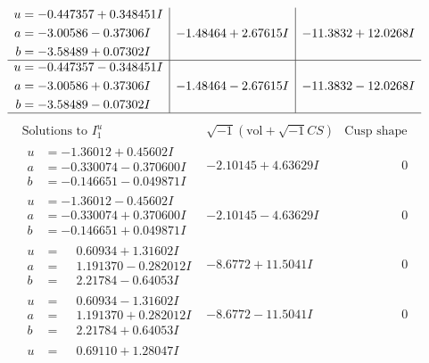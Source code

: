 \documentclass[1p]{elsarticle_modified}
\theoremstyle{definition}
\newcommand{\I}{\sqrt{-1}}
\begin{document}
$$\begin{array}{c|c|c}
\begin{aligned}
u &= -0.447357 + 0.348451 I \\
a &= -3.00586 - 0.37306 I \\
b &= -3.58489 + 0.07302 I\end{aligned}
 & -1.48464 + 2.67615 I & -11.3832 + 12.0268 I \\ \hline\begin{aligned}
u &= -0.447357 - 0.348451 I \\
a &= -3.00586 + 0.37306 I \\
b &= -3.58489 - 0.07302 I\end{aligned}
 & -1.48464 - 2.67615 I & -11.3832 - 12.0268 I\\
 \hline 
 \end{array}$$\newpage$$\begin{array}{c|c|c}  
\text{Solutions to }I^u_{1}& \I (\text{vol} + \sqrt{-1}CS) & \text{Cusp shape}\\
 \hline 
\begin{aligned}
u &= -1.36012 + 0.45602 I \\
a &= -0.330074 - 0.370600 I \\
b &= -0.146651 - 0.049871 I\end{aligned}
 & -2.10145 + 4.63629 I & \phantom{-0.000000 } 0 \\ \hline\begin{aligned}
u &= -1.36012 - 0.45602 I \\
a &= -0.330074 + 0.370600 I \\
b &= -0.146651 + 0.049871 I\end{aligned}
 & -2.10145 - 4.63629 I & \phantom{-0.000000 } 0 \\ \hline\begin{aligned}
u &= \phantom{-}0.60934 + 1.31602 I \\
a &= \phantom{-}1.191370 - 0.282012 I \\
b &= \phantom{-}2.21784 - 0.64053 I\end{aligned}
 & -8.6772 + 11.5041 I & \phantom{-0.000000 } 0 \\ \hline\begin{aligned}
u &= \phantom{-}0.60934 - 1.31602 I \\
a &= \phantom{-}1.191370 + 0.282012 I \\
b &= \phantom{-}2.21784 + 0.64053 I\end{aligned}
 & -8.6772 - 11.5041 I & \phantom{-0.000000 } 0 \\ \hline\begin{aligned}
u &= \phantom{-}0.69110 + 1.28047 I \\

\end{aligned}
\end{array}$$
\end{document}
